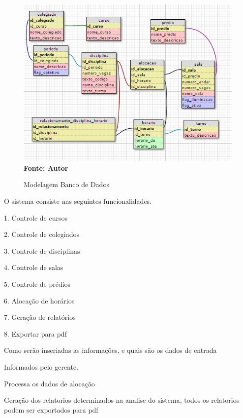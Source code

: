 		\begin{figure}[!htb]
   		\caption[Modelagem Banco de Dados]{Modelagem Banco de Dados}
   		\label{fig:figura3}
   		\centering
   		\includegraphics{modelagemBanco.png}
   		\\ \textbf{\footnotesize Fonte: Autor}
	\end{figure}


	O sistema consiste nas seguintes funcionalidades.

	1. Controle de cursos \par
	2. Controle de colegiados\par
	3. Controle de disciplinas\par
	4. Controle de salas\par
	5. Controle de prédios\par
	6. Alocação de horários\par
	7. Geração de relatórios\par
	8. Exportar para pdf\par




	Como serão inseriadas as informações, e quais são os dados de entrada

	Informados pelo gerente.


	Processa os dados de alocação


	Geração dos relatorios determinados na analise do sistema, todos os relatorios podem ser exportados para pdf



